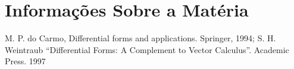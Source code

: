 \documentclass[12pt]{article}
\theoremstyle{definition}
\begin{document}
\tableofcontents

\newpage

\section{Informações Sobre a Matéria}
\newpage

\newpage


\begin{thebibliography}{99}
	\bibitem M. P. do Carmo, Differential forms and applications. Springer, 1994;
	\bibitem S. H. Weintraub “Differential Forms: A Complement to Vector Calculus”. Academic Press. 1997
\end{thebibliography}
\end{document}
